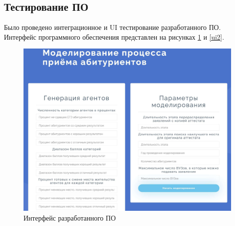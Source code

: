 \subsection{Тестирование ПО}

Было проведено интеграционное и UI тестирование разработанного ПО. Интерфейс программного обеспечения представлен на рисунках \ref{ui1} и \ref{ui2}.

\begin{figure}[hbtp]
	\centering
	\includegraphics[scale=0.2]{img/ui1.pdf}
	\caption{Интерфейс разработанного ПО}
	\label{ui1}
\end{figure}


